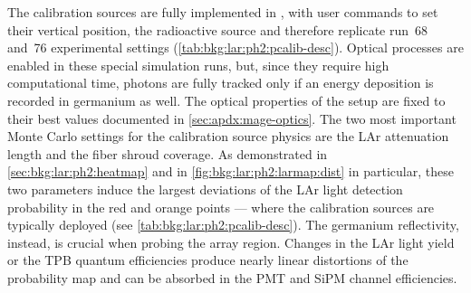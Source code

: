 The calibration sources are fully implemented in \mage, with user commands to set their
vertical position, the radioactive source and therefore replicate run~68 and~76
experimental settings (\cref{tab:bkg:lar:ph2:pcalib-desc}). Optical
processes are enabled in these special simulation runs, but, since they require high
computational time, photons are fully tracked only if an energy deposition is recorded in
germanium as well. The optical properties of the setup are fixed to their best values
documented in \cref{sec:apdx:mage-optics}. The two most important Monte Carlo settings
for the calibration source physics are the LAr attenuation length and the fiber shroud
coverage. As demonstrated in \cref{sec:bkg:lar:ph2:heatmap} and in
\cref{fig:bkg:lar:ph2:larmap:dist} in particular, these two parameters induce the largest
deviations of the LAr light detection probability in the red and orange points --- where the
calibration sources are typically deployed (see \cref{tab:bkg:lar:ph2:pcalib-desc}). The
germanium reflectivity, instead, is crucial when probing the array region. Changes
in the LAr light yield or the TPB quantum efficiencies produce nearly linear distortions
of the probability map and can be absorbed in the PMT and SiPM channel efficiencies.


